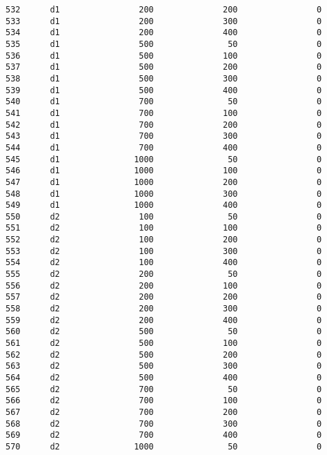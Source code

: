 \documentclass[11pt]{article}
\begin{document}
\begin{Verbatim}[commandchars=\\\{\}]
532      d1                200              200                0   
533      d1                200              300                0   
534      d1                200              400                0   
535      d1                500               50                0   
536      d1                500              100                0   
537      d1                500              200                0   
538      d1                500              300                0   
539      d1                500              400                0   
540      d1                700               50                0   
541      d1                700              100                0   
542      d1                700              200                0   
543      d1                700              300                0   
544      d1                700              400                0   
545      d1               1000               50                0   
546      d1               1000              100                0   
547      d1               1000              200                0   
548      d1               1000              300                0   
549      d1               1000              400                0   
550      d2                100               50                0   
551      d2                100              100                0   
552      d2                100              200                0   
553      d2                100              300                0   
554      d2                100              400                0   
555      d2                200               50                0   
556      d2                200              100                0   
557      d2                200              200                0   
558      d2                200              300                0   
559      d2                200              400                0   
560      d2                500               50                0   
561      d2                500              100                0   
562      d2                500              200                0   
563      d2                500              300                0   
564      d2                500              400                0   
565      d2                700               50                0   
566      d2                700              100                0   
567      d2                700              200                0   
568      d2                700              300                0   
569      d2                700              400                0   
570      d2               1000               50                0   

\end{Verbatim}
\end{document}
